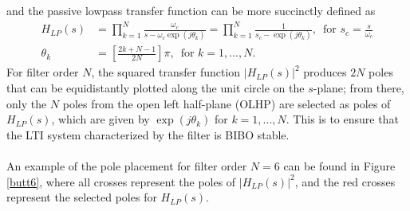 \documentclass{report}
\begin{document}
and the passive lowpass transfer function can be more succinctly defined as 
\begin{align}
    H_{LP}(s) &= \prod_{k=1}^{N} \frac{\omega_c}{s-\omega_c \exp(j\theta_k)} = \prod_{k=1}^{N} \frac{1}{s_c-\exp(j\theta_k)} , \, \text{ for } s_c=\frac{s}{\omega_c} \\
    \theta_k &= \left[\frac{2k+N-1}{2N}\right]\pi, \, \text{ for } k=1,...,N.
\end{align}
For filter order $N$, the squared transfer function $|H_{LP}(s)|^2$ produces $2N$ poles that can be equidistantly plotted along the unit circle on the $s$-plane; 
from there, only the $N$ poles from the open left half-plane (OLHP) are selected as poles of $H_{LP}(s)$, which are given by $\exp(j\theta_k)$ for $k=1,...,N$. 
This is to ensure that the LTI system characterized by the filter is BIBO stable. 
\\ \\
An example of the pole placement for filter order $N=6$ can be found in 
Figure \ref{butt6}, where all crosses represent the poles of $|H_{LP}(s)|^2$, and the red crosses represent the selected poles for $H_{LP}(s)$.
\end{document}
